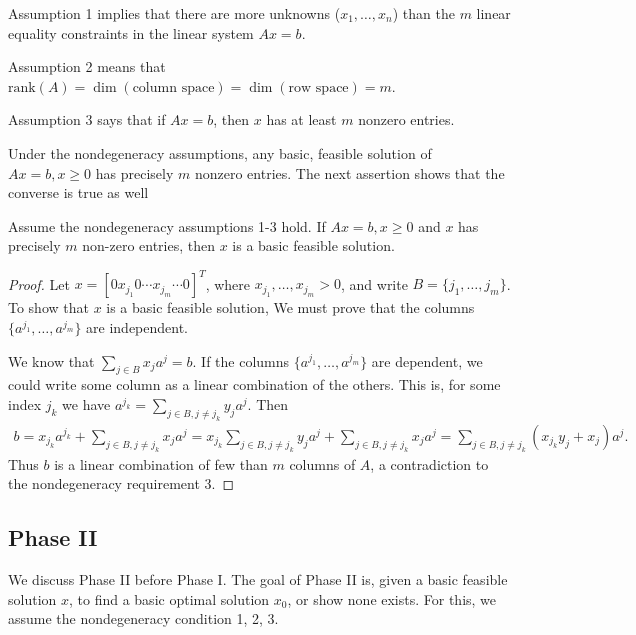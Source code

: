 Assumption 1 implies that there are more unknowns ($x_1, \dots , x_n$) than the $m$ linear equality constraints in the linear system $Ax = b$.

Assumption 2 means that $\mathrm{rank}(A) = \dim (\text{column space}) = \dim (\text{row space}) = m$.

Assumption 3 says that if $Ax = b$, then $x$ has at least $m$ nonzero entries.

\begin{remark}
Under the nondegeneracy assumptions, any basic, feasible solution of $Ax = b, x \ge 0$ has precisely $m$ nonzero entries.
The next assertion shows that the converse is true as well
\end{remark}

\begin{lemma}[On nondegeneracy]
Assume the nondegeneracy assumptions 1-3 hold.
If $Ax = b, x \ge 0$ and $x$ has precisely $m$ non-zero entries, then $x$ is a basic feasible solution.
\end{lemma}

\begin{proof}
Let $x = [0 x_{j_1} 0 \cdots x_{j_m} \cdots 0]^T$, where $x_{j_1}, \dots, x_{j_m} > 0$, and write $B = \{ j_1, \dots, j_m \}$.
To show that $x$ is a basic feasible solution, We must prove that the columns $\{ a^{j_1}, \dots, a^{j_m} \}$ are independent. 

We know that $\sum _{j \in B} x_j a^j = b$.
If the columns $\{ a^{j_1}, \dots, a^{j_m} \}$ are dependent, we could write some column as a linear combination of the others.
This is, for some index $j_k$ we have $a^{j_k} = \sum _ {j \in B, j \neq j_k} y_j a^j$.
Then 
\begin{align}
b = x_{j_k} a^{j_k} + \sum _ {j \in B, j \neq j_k} x_j a^j 
= x_{j_k} \sum _ {j \in B, j \neq j_k} y_j a^j + \sum _ {j \in B, j \neq j_k} x_j a^j 
= \sum _ {j \in B, j \neq j_k} (x_{j_k} y_{j} + x_j) a^j.
\end{align}
Thus $b$ is a linear combination of few than $m$ columns of $A$, a contradiction to the nondegeneracy requirement 3.
\end{proof}

\subsection{Phase II}

We discuss Phase II before Phase I.
The goal of Phase II is, given a basic feasible solution $x$, to find a basic optimal solution $x_0$, or show none exists.
For this, we assume the nondegeneracy condition 1, 2, 3.


